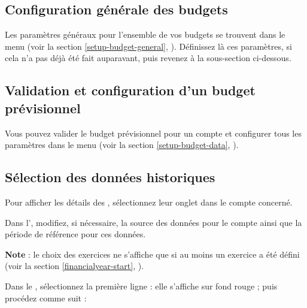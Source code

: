 \subsection{Configuration générale des budgets\label{budget-create-general}}

Les paramètres généraux pour l'ensemble de vos budgets se trouvent dans le menu  (voir la section \vref{setup-budget-general}, ). Définissez là ces paramètres, si cela n'a pas déjà été fait auparavant, puis revenez à la sous-section ci-dessous.


\subsection{Validation et configuration d'un budget prévisionnel\label{budget-create-configure}}

Vous pouvez valider le budget prévisionnel pour un compte et configurer tous les paramètres dans le menu  (voir la section \vref{setup-budget-data}, ). 


\subsection{Sélection des données historiques\label{budget-create-selection}}

Pour afficher les détails des , sélectionnez leur onglet dans le compte concerné.

Dans l', modifiez, si nécessaire, la source des données pour le compte ainsi que la période de référence pour ces données.

\textbf{Note} : le choix des exercices ne s'affiche que si au moins un exercice a été défini (voir la section \vref{financialyear-start}, ).

Dans le , sélectionnez la première ligne : elle s'affiche sur fond rouge{\couleur} ; puis procédez comme suit :

